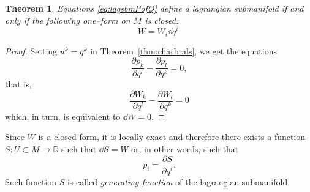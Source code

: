 \documentclass[english,fontsize=11pt,paper=b5]{scrbook}
\numberwithin{equation}{chapter}
\newtheorem{theorem}{Theorem}[chapter]
\theoremstyle{definition}
\begin{document}
    \begin{theorem}\label{thm:lsoform}
      Equations \eqref{eq:lagsbmPofQ} define a lagrangian submanifold if and only if the following one--form on $M$ is closed:
      \begin{equation}
        W = W_i \dd q^i.
      \end{equation}
    \end{theorem}
    \begin{proof}
      Setting $u^k = q^k$ in Theorem~\ref{thm:charbrals}, we get the equations
      \begin{equation}
        \frac{\partial p_k}{\partial q^l} - \frac{\partial p_l}{\partial q^k} = 0,
      \end{equation}
      that is,
      \begin{equation}
        \frac{\partial W_k}{\partial q^l} - \frac{\partial W_l}{\partial q^k} = 0
      \end{equation}
      which, in turn, is equivalent to $\dd W = 0$.
    \end{proof}

    Since $W$ is a closed form, it is locally exact and therefore there exists a function $S: U \subset M \to \mathbb{R}$ such that $\dd S = W$ or, in other words, such that
    \begin{equation}
      p_i = \frac{\partial S}{\partial q^i}.
    \end{equation}
    Such function $S$ is called \emph{generating function} of the lagrangian submanifold.
\end{document}
